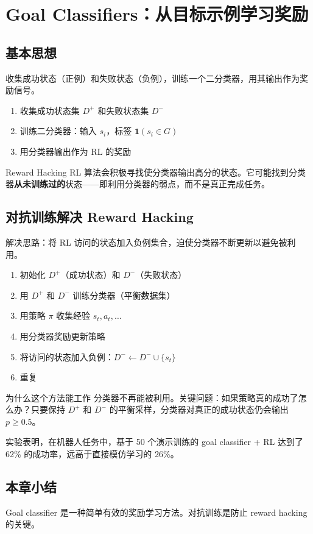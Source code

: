 \section{Goal Classifiers：从目标示例学习奖励}

\subsection{基本思想}

收集成功状态（正例）和失败状态（负例），训练一个二分类器，用其输出作为奖励信号。

\begin{enumerate}
    \item 收集成功状态集 $D^+$ 和失败状态集 $D^-$
    \item 训练二分类器：输入 $s_i$，标签 $\mathbf{1}(s_i \in G)$
    \item 用分类器输出作为 RL 的奖励
\end{enumerate}

\begin{warningbox}{Reward Hacking}
RL 算法会积极寻找使分类器输出高分的状态。它可能找到分类器\textbf{从未训练过的}状态——即利用分类器的弱点，而不是真正完成任务。
\end{warningbox}

\subsection{对抗训练解决 Reward Hacking}

解决思路：将 RL 访问的状态加入负例集合，迫使分类器不断更新以避免被利用。

\begin{enumerate}
    \item 初始化 $D^+$（成功状态）和 $D^-$（失败状态）
    \item 用 $D^+$ 和 $D^-$ 训练分类器（平衡数据集）
    \item 用策略 $\pi$ 收集经验 $s_t, a_t, \ldots$
    \item 用分类器奖励更新策略
    \item 将访问的状态加入负例：$D^- \leftarrow D^- \cup \{s_t\}$
    \item 重复
\end{enumerate}

\begin{knowledgebox}{为什么这个方法能工作}
分类器不再能被利用。关键问题：如果策略真的成功了怎么办？只要保持 $D^+$ 和 $D^-$ 的平衡采样，分类器对真正的成功状态仍会输出 $p \geq 0.5$。
\end{knowledgebox}

实验表明，在机器人任务中，基于 50 个演示训练的 goal classifier + RL 达到了 62\% 的成功率，远高于直接模仿学习的 26\%。

\subsection{本章小结}

Goal classifier 是一种简单有效的奖励学习方法。对抗训练是防止 reward hacking 的关键。

